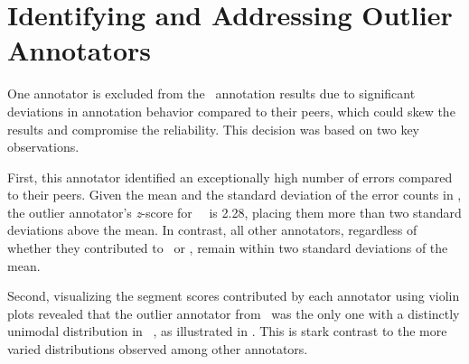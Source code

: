 \section{Identifying and Addressing Outlier Annotators}\label{appendix:outlier_annotator}

One annotator is excluded from the \ZhEn~annotation results due to significant deviations in annotation behavior compared to their peers, which could skew the results and compromise the reliability. This decision was based on two key observations. 

First, this annotator identified an exceptionally high number of errors compared to their peers. Given the mean and the standard deviation of the error counts in , the outlier annotator's \textit{z}-score for \ZhEn~\sxsmqm~is 2.28, placing them more than two standard deviations above the mean. In contrast, all other annotators, regardless of whether they contributed to \ZhEn~or \EnDe, remain within two standard deviations of the mean.

\begin{table}[ht]
\fontsize{5}{6}\selectfont
\centering
\caption{
Mean and standard deviation of the error counts from 8 \ZhEn~and 10 \EnDe~annotators.
}
\label{tab:mean_std_error_cnt}
\end{table}

Second, visualizing the segment scores contributed by each annotator using violin plots revealed that the outlier annotator from \ZhEn~was the only one with a distinctly unimodal distribution in \ZhEn~\sxsmqm, as illustrated in . This is stark contrast to the more varied distributions observed among other annotators. %

